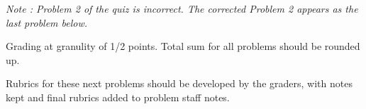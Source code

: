\documentclass[quiz]{mcs}
\begin{document}
\renewcommand{\exampreamble}{   %
  \begin{tabular}{l}
    \textbf{Circle your}\quad   \teaminfo
  \end{tabular}

  \begin{itemize}

  \item
   This exam is \textbf{closed book} except for a 1-sided cribsheet.
   Total time is 20 minutes. 

  \item
   Write your solutions in the space provided.  If you need more
   space, write on the back of the sheet containing the problem.

\iffalse
  \item
   GOOD LUCK!
\fi

  \end{itemize}}


\emph{Note : Problem 2 of the quiz is incorrect. The
corrected Problem 2 appears as the last problem below.
}


\begin{staffnotes}
Grading at granulity of 1/2 points.  Total sum for all problems
should be rounded up.
\end{staffnotes}






\examspace

\begin{staffnotes}
Rubrics for these next problems should be developed by the graders,
with notes kept and final rubrics added to problem staff notes.
\end{staffnotes}





\end{document}
